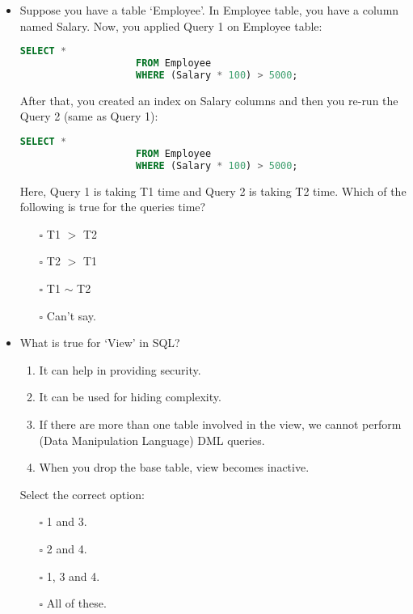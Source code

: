\documentclass[10pt]{article}
\begin{document}
\begin{itemize}
			\item Suppose you have a table ‘Employee’. In Employee table, you have a column named Salary. Now, you applied Query 1 on Employee table:
				\begin{lstlisting}[language=SQL,firstline=1, lastline=3] 
					SELECT * 
					FROM Employee 
					WHERE (Salary * 100) > 5000;
				\end{lstlisting}
				After that, you created an index on Salary columns and then you re-run the Query 2 (same as Query 1):
				\begin{lstlisting}[language=SQL,firstline=1, lastline=3] 
					SELECT * 
					FROM Employee 
					WHERE (Salary * 100) > 5000;
				\end{lstlisting}
				Here, Query 1 is taking T1 time and Query 2 is taking T2 time. Which of the following is true for the queries time?
				\begin{enumerate}
					\item[$\square$] T1 $>$ T2
					\item[$\square$] T2 $>$ T1
					\item[$\square$] T1 $\sim$ T2
					\item[$\square$] Can’t say.
				\end{enumerate}
				
			\item What is true for ‘View’ in SQL?
				\begin{enumerate}
					\item It can help in providing security.
					\item It can be used for hiding complexity.
					\item If there are more than one table involved in the view, we cannot perform (Data Manipulation Language) DML queries.
					\item When you drop the base table, view becomes inactive.
				\end{enumerate}
				Select the correct option:
				\begin{enumerate}
					\item[$\square$] 1 and 3.
					\item[$\square$] 2 and 4.
					\item[$\square$] 1, 3 and 4.
					\item[$\square$] All of these.
				\end{enumerate}

			\newpage
			

\end{itemize}
\end{document}
